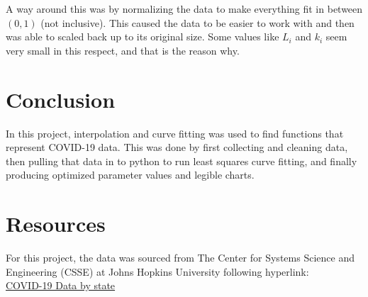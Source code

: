 \documentclass[12pt]{article}
\begin{document}
\noindent A way around this was by normalizing the data to make everything fit in between $(0,1)$ (not inclusive). This caused the data to be easier to work with and then was able to scaled back up to its original size. Some values like $L_{i}$ and $k_{i}$ seem very small in this respect, and that is the reason why.

\section{Conclusion}
In this project, interpolation and curve fitting was used to find functions that represent COVID-19 data. This was done by first collecting and cleaning data, then pulling that data in to python to run least squares curve fitting, and finally producing optimized parameter values and legible charts. \\

\section{Resources}
For this project, the data was sourced from The Center for Systems Science and Engineering (CSSE) at Johns Hopkins University following hyperlink: \\

\noindent \href{https://github.com/CSSEGISandData/COVID-19}{COVID-19 Data by state} \\
\end{document}
